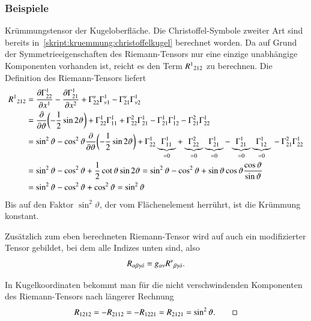 \subsubsection{Beispiele}

\begin{beispiel}
Krümmungstensor der Kugeloberfläche.
Die Christoffel-Symbole zweiter Art sind bereits
in~\eqref{skript:kruemmung:christoffelkugel}
berechnet worden.
Da auf Grund der Symmetrieeigenschaften des Riemann-Tensors nur eine
einzige unabhängige Komponenten vorhanden ist, reicht es den
Term $R^1\mathstrut_{212}$ zu berechnen.
Die Definition des Riemann-Tensors liefert
\begin{align*}
R^1\mathstrut_{212}
&=
\frac{\partial \Gamma_{22}^1}{\partial x^1}
-
\frac{\partial \Gamma_{21}^1}{\partial x^2}
+
\Gamma_{22}^\nu
\Gamma_{\nu1}^1
-
\Gamma_{21}^\nu
\Gamma_{\nu2}^1
\\
&=
\frac{\partial}{\partial\vartheta}\biggl(-\frac12\sin2\vartheta\biggr)
+
\Gamma_{22}^1
\Gamma_{11}^1
+
\Gamma_{22}^2
\Gamma_{21}^1
-
\Gamma_{21}^1
\Gamma_{12}^1
-
\Gamma_{21}^2
\Gamma_{22}^1
\\
&=
\sin^2\vartheta - \cos^2\vartheta
\frac{\partial}{\partial\vartheta}\biggl(-\frac12\sin2\vartheta\biggr)
+
\Gamma_{22}^1
\underbrace{\Gamma_{11}^1}_{=0}
+
\underbrace{\Gamma_{22}^2}_{=0}
\underbrace{\Gamma_{21}^1}_{=0}
-
\underbrace{\Gamma_{21}^1}_{=0}
\underbrace{\Gamma_{12}^1}_{=0}
\mathstrut
-
\Gamma_{21}^2
\Gamma_{22}^1
\\
&=
\sin^2\vartheta - \cos^2\vartheta
+
\frac12 \cot \vartheta \sin2\vartheta
=
\sin^2\vartheta - \cos^2\vartheta
+
\sin\vartheta\cos\vartheta\frac{\cos\vartheta}{\sin\vartheta}
\\
&=
\sin^2\vartheta - \cos^2\vartheta
+
\cos^2\vartheta
=
\sin^2\vartheta
\end{align*}
Bis auf den Faktor $\sin^2\vartheta$, der vom Flächenelement herrührt,
ist die Krümmung konstant.
\end{beispiel}

Zusätzlich zum eben berechneten Riemann-Tensor wird auf auch ein
modifizierter Tensor gebildet, bei dem alle Indizes unten sind,
also
\[
R_{\alpha\beta\gamma\delta} = g_{\alpha\nu}R^\nu\mathstrut_{\beta\gamma\delta}.
\]

\begin{beispiel}
In Kugelkoordinaten bekommt man für die nicht verschwindenden Komponenten
des Riemann-Tensors nach längerer Rechnung
\[
R_{1212}
=
-R_{2112}
=
-R_{1221}
=
R_{2121}
=
\sin^2\vartheta.
\qedhere
\]
\end{beispiel}

